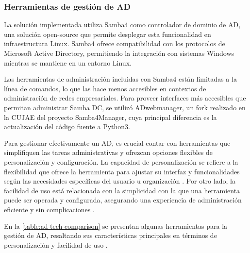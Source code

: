 \subsubsection{Herramientas de gestión de AD}

La solución implementada utiliza Samba4 como controlador de dominio de AD, una solución open-source que permite desplegar esta funcionalidad en infraestructura Linux. Samba4 ofrece compatibilidad con los protocolos de Microsoft Active Directory, permitiendo la integración con sistemas Windows mientras se mantiene en un entorno Linux.

Las herramientas de administración incluidas con Samba4 están limitadas a la línea de comandos, lo que las hace menos accesibles en contextos de administración de redes empresariales. Para proveer interfaces más accesibles que permitan administrar Samba DC, se utilizó ADwebmanager\autocite{jerez_vicentgjad-webmanager_2024}, un fork realizado en la CUJAE del proyecto Samba4Manager\autocite{graber_stgrabersamba4-manager_2024}, cuya principal diferencia es la actualización del código fuente a Python3.

Para gestionar efectivamente un AD, es crucial contar con herramientas que simplifiquen las tareas administrativas y ofrezcan opciones flexibles de personalización y configuración. La capacidad de personalización se refiere a la flexibilidad que ofrece la herramienta para ajustar su interfaz y funcionalidades según las necesidades específicas del usuario u organización \autocite{van_der_hoek_configurable_1999}. Por otro lado, la facilidad de uso está relacionada con la simplicidad con la que una herramienta puede ser operada y configurada, asegurando una experiencia de administración eficiente y sin complicaciones \autocite{sheppard_re-examining_2019}.

En la \autoref{table:ad-tech-comparison} se presentan algunas herramientas para la gestión de AD, resaltando sus características principales en términos de personalización y facilidad de uso \autocite{graber_stgrabersamba4-manager_2024,jerez_vicentgjad-webmanager_2024,han_remote_2024,karzynski_webmin_2014}.

